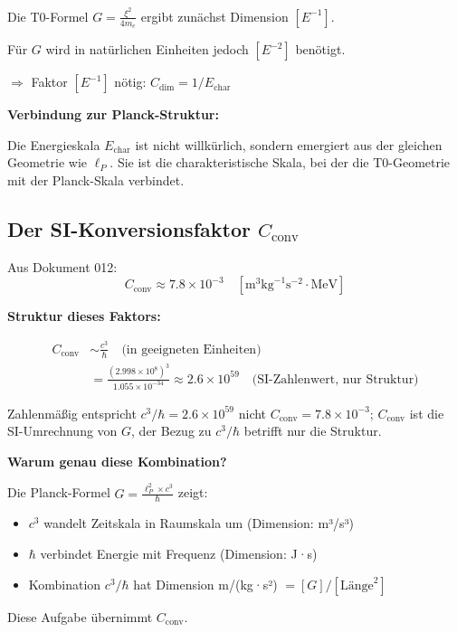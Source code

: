 	Die T0-Formel $G = \frac{\xi^2}{4m_e}$ ergibt zunächst Dimension $[E^{-1}]$.
	
	Für $G$ wird in natürlichen Einheiten jedoch $[E^{-2}]$ benötigt.
	
	$\Rightarrow$ Faktor $[E^{-1}]$ nötig: $C_{\text{dim}} = 1/E_{\text{char}}$
	
	\textbf{Verbindung zur Planck-Struktur:}
	
	Die Energieskala $E_{\text{char}}$ ist nicht willkürlich, sondern emergiert aus der gleichen Geometrie wie $\ell_P$. Sie ist die charakteristische Skala, bei der die T0-Geometrie mit der Planck-Skala verbindet.
	
	\subsection{Der SI-Konversionsfaktor $C_{\text{conv}}$}
	
	Aus Dokument 012:
	\begin{equation}
		C_{\text{conv}} \approx 7.8 \times 10^{-3} \quad [\text{m}^3 \text{kg}^{-1} \text{s}^{-2} \cdot \text{MeV}]
	\end{equation}
	
	\textbf{Struktur dieses Faktors:}
	
	\begin{align}
		C_{\text{conv}} &\sim \frac{c^3}{\hbar} \quad \text{(in geeigneten Einheiten)} \\
		&= \frac{(2.998 \times 10^8)^3}{1.055 \times 10^{-34}} \approx 2.6 \times 10^{59} \quad \text{(SI-Zahlenwert, nur Struktur)}
	\end{align}
	

	Zahlenmäßig entspricht $c^3/\hbar = 2.6\times10^{59}$ nicht $C_{\text{conv}} = 7.8\times10^{-3}$; $C_{\text{conv}}$ ist die SI-Umrechnung von $G$, der Bezug zu $c^3/\hbar$ betrifft nur die Struktur.
	
	\textbf{Warum genau diese Kombination?}
	
	Die Planck-Formel $G = \frac{\ell_P^2 \times c^3}{\hbar}$ zeigt:
	\begin{itemize}
		\item $c^3$ wandelt Zeitskala in Raumskala um (Dimension: m³/s³)
		\item $\hbar$ verbindet Energie mit Frequenz (Dimension: J·s)
		\item Kombination $c^3/\hbar$ hat Dimension m/(kg·s²) $= [G]/[\text{Länge}^2]$
	\end{itemize}
	
	Diese Aufgabe übernimmt $C_{\text{conv}}$.
	
